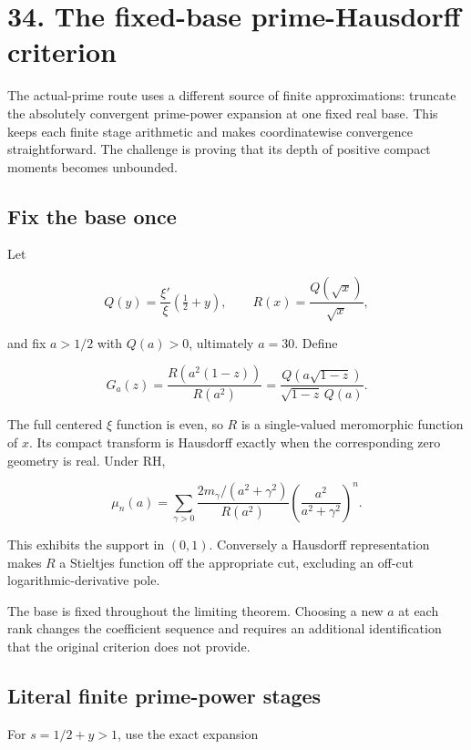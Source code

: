\documentclass[
  10pt,
  a4paper,
  10pt,
  oneside,
  openany]{book}
\begin{document}
\section{34. The fixed-base prime-Hausdorff
criterion}\label{ch-fixedbase}

The actual-prime route uses a different source of finite approximations:
truncate the absolutely convergent prime-power expansion at one fixed
real base. This keeps each finite stage arithmetic and makes
coordinatewise convergence straightforward. The challenge is proving
that its depth of positive compact moments becomes unbounded.

\subsection{Fix the base once}\label{fix-the-base-once}

Let

\[
 Q(y)=\frac{\xi'}{\xi}(\tfrac12+y),\qquad
 R(x)=\frac{Q(\sqrt x)}{\sqrt x},
\]

and fix \(a>1/2\) with \(Q(a)>0\), ultimately \(a=30\). Define

\[
 G_a(z)=\frac{R(a^2(1-z))}{R(a^2)}
 =\frac{Q(a\sqrt{1-z})}{\sqrt{1-z}\,Q(a)}.
 \tag{34.1}\label{eq:34.1}
\]

The full centered \(\xi\) function is even, so \(R\) is a single-valued
meromorphic function of \(x\). Its compact transform is Hausdorff
exactly when the corresponding zero geometry is real. Under RH,

\[
 \mu_n(a)=\sum_{\gamma>0}
 \frac{2m_\gamma/(a^2+\gamma^2)}{R(a^2)}
 \left(\frac{a^2}{a^2+\gamma^2}\right)^n.
 \tag{34.2}\label{eq:34.2}
\]

This exhibits the support in \((0,1)\). Conversely a Hausdorff
representation makes \(R\) a Stieltjes function off the appropriate cut,
excluding an off-cut logarithmic-derivative pole.

The base is fixed throughout the limiting theorem. Choosing a new \(a\)
at each rank changes the coefficient sequence and requires an additional
identification that the original criterion does not provide.

\subsection{Literal finite prime-power
stages}\label{literal-finite-prime-power-stages}

For \(s=1/2+y>1\), use the exact expansion
\end{document}
